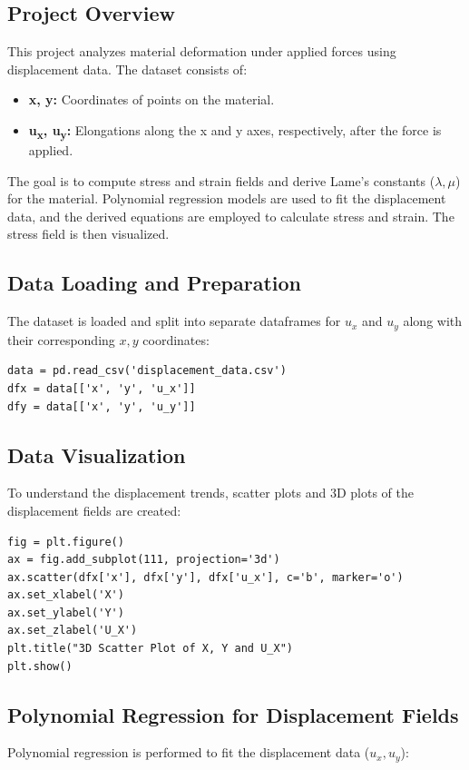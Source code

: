 \documentclass[fleqn,10pt]{olplainarticle}
\begin{document}
\subsection{Project Overview}
This project analyzes material deformation under applied forces using displacement data. The dataset consists of:
\begin{itemize}
    \item \textbf{x, y:} Coordinates of points on the material.
    \item \textbf{u\textsubscript{x}, u\textsubscript{y}:} Elongations along the x and y axes, respectively, after the force is applied.
\end{itemize}
The goal is to compute stress and strain fields and derive Lame's constants (\(\lambda, \mu\)) for the material. Polynomial regression models are used to fit the displacement data, and the derived equations are employed to calculate stress and strain. The stress field is then visualized.

\subsection{Data Loading and Preparation}
The dataset is loaded and split into separate dataframes for \(u_x\) and \(u_y\) along with their corresponding \(x, y\) coordinates:
\begin{verbatim}
data = pd.read_csv('displacement_data.csv')
dfx = data[['x', 'y', 'u_x']]
dfy = data[['x', 'y', 'u_y']]
\end{verbatim}

\subsection{Data Visualization}
To understand the displacement trends, scatter plots and 3D plots of the displacement fields are created:
\begin{verbatim}
fig = plt.figure()
ax = fig.add_subplot(111, projection='3d')
ax.scatter(dfx['x'], dfx['y'], dfx['u_x'], c='b', marker='o')
ax.set_xlabel('X')
ax.set_ylabel('Y')
ax.set_zlabel('U_X')
plt.title("3D Scatter Plot of X, Y and U_X")
plt.show()
\end{verbatim}

\subsection{Polynomial Regression for Displacement Fields}
Polynomial regression is performed to fit the displacement data (\(u_x, u_y\)):
\end{document}
